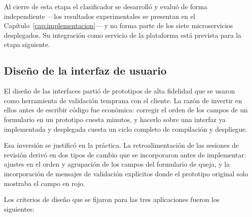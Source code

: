 	Al cierre de esta etapa el clasificador se desarrolló y evaluó de forma independiente ---los
	resultados experimentales se presentan en el Capítulo~\ref{cap:implementacion}--- y no forma
	parte de los siete microservicios desplegados. Su integración como servicio de la plataforma
	está prevista para la etapa siguiente.
	
	\subsection{Diseño de la interfaz de usuario}
	\label{sec:diseno_interfaz}
	El diseño de las interfaces partió de prototipos de alta fidelidad que se usaron como
	herramienta de validación temprana con el cliente. La razón de invertir en ellos antes de
	escribir código fue económica: corregir el orden de los campos de un formulario en un prototipo
	cuesta minutos, y hacerlo sobre una interfaz ya implementada y desplegada cuesta un ciclo
	completo de compilación y despliegue.
	
	Esa inversión se justificó en la práctica. La retroalimentación de las sesiones de revisión
	derivó en dos tipos de cambio que se incorporaron antes de implementar: ajustes en el orden y
	agrupación de los campos del formulario de queja, y la incorporación de mensajes de validación
	explícitos donde el prototipo original solo mostraba el campo en rojo.
	
	Los criterios de diseño que se fijaron para las tres aplicaciones fueron los siguientes:
	
